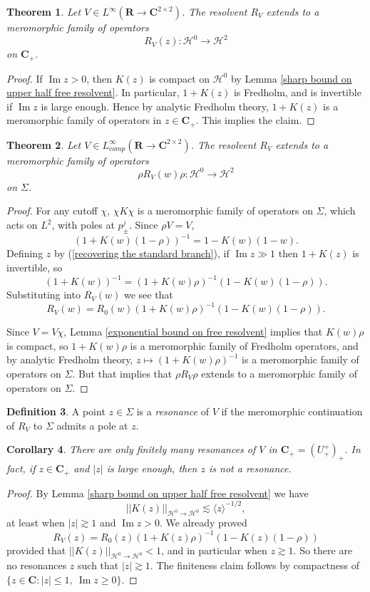 \documentclass[reqno,12pt,letterpaper]{amsart}
\newcommand{\RR}{\mathbf{R}}
\newcommand{\CC}{\mathbf{C}}
\newcommand{\dfn}[1]{\emph{#1}\index{#1}}
\renewcommand{\Im}{\operatorname{Im}}
\newtheorem{theorem}{Theorem}[section]
\newtheorem{corollary}[theorem]{Corollary}
\theoremstyle{definition}
\newtheorem{definition}[theorem]{Definition}
\begin{document}
\begin{theorem}
Let $V \in L^\infty(\RR \to \CC^{2 \times 2})$.
The resolvent $R_V$ extends to a meromorphic family of operators
$$R_V(z): \mathcal H^0 \to \mathcal H^2$$
on $\CC_+$.
\end{theorem}
\begin{proof}
If $\Im z > 0$, then $K(z)$ is compact on $\mathcal H^0$ by Lemma \ref{sharp bound on upper half free resolvent}. In particular, $1 + K(z)$ is Fredholm, and is invertible if $\Im z$ is large enough.
Hence by analytic Fredholm theory, $1 + K(z)$ is a meromorphic family of operators in $z \in \CC_+$. This implies the claim.
\end{proof}

\begin{theorem}
Let $V \in L^\infty_{comp}(\RR \to \CC^{2 \times 2})$.
The resolvent $R_V$ extends to a meromorphic family of operators
$$\rho R_V(w) \rho: \mathcal H^0 \to \mathcal H^2$$
on $\Sigma$.
\end{theorem}
\begin{proof}
For any cutoff $\chi$, $\chi K \chi$ is a meromorphic family of operators on $\Sigma$, which acts on $L^2$, with poles at $p_\pm^j$.
Since $\rho V = V$,
$$(1 + K(w)(1-\rho))^{-1} = 1 - K(w)(1 - w).$$
Defining $z$ by (\ref{recovering the standard branch}), if $\Im z \gg 1$ then $1 + K(z)$ is invertible, so
$$(1 + K(w))^{-1} = (1 + K(w)\rho)^{-1}(1 - K(w)(1 - \rho)).$$
Substituting into $R_V(w)$ we see that
$$R_V(w) = R_0(w)(1 + K(w)\rho)^{-1}(1 - K(w)(1 - \rho)).$$

Since $V = V\chi$, Lemma \ref{exponential bound on free resolvent} implies that $K(w)\rho$ is compact, so $1 + K(w)\rho$ is a meromorphic family of Fredholm operators, and by analytic Fredholm theory, $z \mapsto (1 + K(w)\rho)^{-1}$ is a meromorphic family of operators on $\Sigma$.
But that implies that $\rho R_V \rho$ extends to a meromorphic family of operators on $\Sigma$.
\end{proof}

\begin{definition}
A point $z \in \Sigma$ is a \dfn{resonance} of $V$ if the meromorphic continuation of $R_V$ to $\Sigma$ admits a pole at $z$.
\end{definition}

\begin{corollary}
There are only finitely many resonances of $V$ in $\CC_+ = (U_+^+)_+$. In fact, if $z \in \CC_+$ and $|z|$ is large enough, then $z$ is not a resonance.
\end{corollary}
\begin{proof}
By Lemma \ref{sharp bound on upper half free resolvent} we have
$$||K(z)||_{\mathcal H^0 \to \mathcal H^0} \lesssim \langle z \rangle^{-1/2},$$
at least when $|z| \gtrsim 1$ and $\Im z > 0$.
We already proved
$$R_V(z) = R_0(z)(1 + K(z)\rho)^{-1}(1 - K(z)(1 - \rho))$$
provided that $||K(z)||_{\mathcal H^0 \to \mathcal H^0} < 1$, and in particular when $z \gtrsim 1$. So there are no resonances $z$ such that $|z| \gtrsim 1$. The finiteness claim follows by compactness of $\{z \in \CC: |z| \leq 1, ~\Im z \geq 0\}$.
\end{proof}
\end{document}
